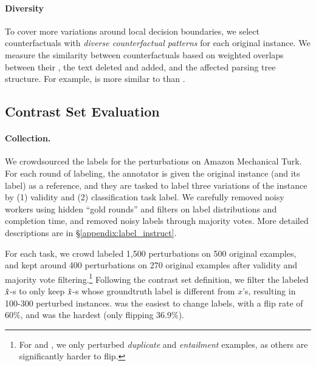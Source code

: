 \paragraph{Diversity}
To cover more variations around local decision boundaries, we select counterfactuals with \emph{diverse counterfactual patterns} for each original instance.
We measure the similarity between counterfactuals based on weighted overlaps between their \tagstrs, the text deleted and added, and the affected parsing tree structure. 
For example, \ctrltag{[lexical]}  is more similar to \ctrltag{[lexical]}  than \ctrltag{[quantifier]} .


\subsection{Contrast Set Evaluation}
\label{subsec:contrast_set}

\paragraph{Collection.} 
We crowdsourced the labels for the perturbations on Amazon Mechanical Turk. 
For each round of labeling, the annotator is given the original instance (and its label) as a reference, and they are tasked to label three variations of the instance by (1) validity and (2) classification task label. 
We carefully removed noisy workers using hidden ``gold rounds'' and filters on label distributions and completion time, and removed noisy labels through majority votes.
More detailed descriptions are in \S\ref{appendix:label_instruct}. 

For each task, we crowd labeled 1,500 perturbations on 500 original examples, and kept around 400 perturbations on 270 original examples after validity and majority vote filtering.\footnote{For \qqp and \nli, we only perturbed \emph{duplicate} and \emph{entailment} examples, as others are significantly harder to flip.}
Following the contrast set definition, we filter the labeled $\hat{x}$-s to only keep $\hat{x}$-s whose groundtruth label is different from $x$'s, resulting in 100-300 perturbed instances.
\nli was the easiest to change labels, with a flip rate of $60\%$, and \sst was the hardest (only flipping 36.9\%).

